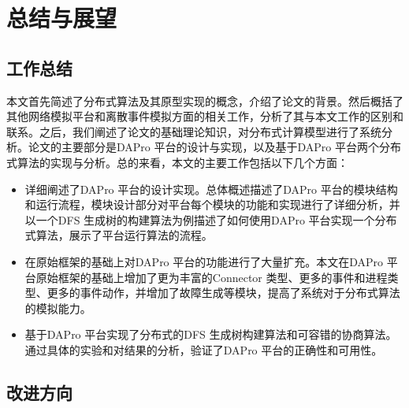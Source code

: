 \chapter{总结与展望}

    \section{工作总结}
    本文首先简述了分布式算法及其原型实现的概念，介绍了论文的背景。然后概括了其他网络模拟平台和离散事件模拟方面的相关工作，分析了其与本文工作的区别和联系。之后，我们阐述了论文的基础理论知识，对分布式计算模型进行了系统分析。论文的主要部分是DAPro 平台的设计与实现，以及基于DAPro 平台两个分布式算法的实现与分析。总的来看，本文的主要工作包括以下几个方面：
    \begin{itemize}
      \item 详细阐述了DAPro 平台的设计实现。总体概述描述了DAPro 平台的模块结构和运行流程，模块设计部分对平台每个模块的功能和实现进行了详细分析，并以一个DFS 生成树的构建算法为例描述了如何使用DAPro 平台实现一个分布式算法，展示了平台运行算法的流程。
      \item 在原始框架的基础上对DAPro 平台的功能进行了大量扩充。本文在DAPro 平台原始框架的基础上增加了更为丰富的Connector 类型、更多的事件和进程类型、更多的事件动作，并增加了故障生成等模块，提高了系统对于分布式算法的模拟能力。
      \item 基于DAPro 平台实现了分布式的DFS 生成树构建算法和可容错的协商算法。通过具体的实验和对结果的分析，验证了DAPro 平台的正确性和可用性。
    \end{itemize}

    \section{改进方向}